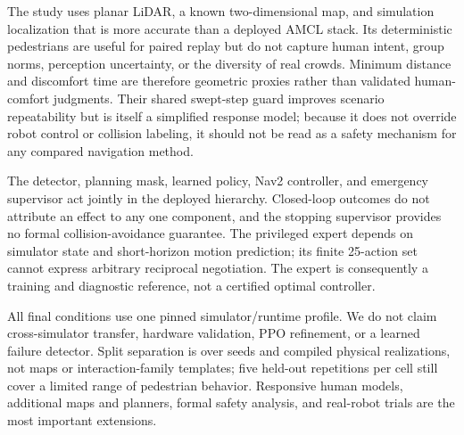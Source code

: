 The study uses planar LiDAR, a known two-dimensional map, and simulation
localization that is more accurate than a deployed AMCL stack.  Its
deterministic pedestrians are useful for paired replay but do not capture human
intent, group norms, perception uncertainty, or the diversity of real crowds.
Minimum distance and discomfort time are therefore geometric proxies rather
than validated human-comfort judgments.  Their shared swept-step guard improves
scenario repeatability but is itself a simplified response model; because it
does not override robot control or collision labeling, it should not be read as
a safety mechanism for any compared navigation method.

The detector, planning mask, learned policy, Nav2 controller, and emergency
supervisor act jointly in the deployed hierarchy.  Closed-loop outcomes do not
attribute an effect to any one component, and the stopping supervisor provides
no formal collision-avoidance guarantee.  The privileged expert depends on
simulator state and short-horizon motion prediction; its finite 25-action set
cannot express arbitrary reciprocal negotiation.  The expert is consequently
a training and diagnostic reference, not a certified optimal controller.

All final conditions use one pinned simulator/runtime profile.  We do not claim
cross-simulator transfer, hardware validation, PPO refinement, or a learned
failure detector.  Split separation is over seeds and compiled physical
realizations, not maps or interaction-family templates; five held-out
repetitions per cell still cover a limited range of pedestrian behavior.
Responsive human models, additional maps and planners, formal safety analysis,
and real-robot trials are the most important extensions.
